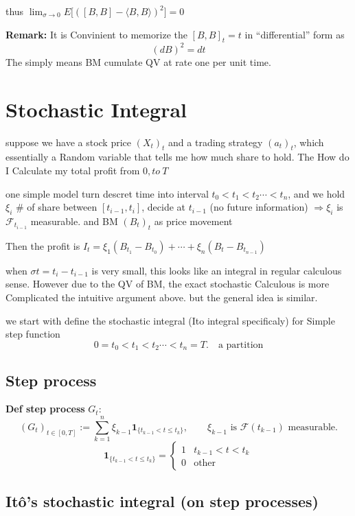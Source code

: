 \documentclass[
  letterpaper,
  DIV=11,
  numbers=noendperiod]{scrreprt}
\theoremstyle{definition}
\theoremstyle{plain}
\theoremstyle{plain}
\theoremstyle{definition}
\theoremstyle{plain}
\theoremstyle{plain}
\theoremstyle{remark}
\begin{document}
thus
\(\lim_{\sigma \to 0} E\big[([B, B] - \langle B, B\rangle)^2\big] = 0\)

\textbf{Remark:} It is Convinient to memorize the \([B, B]_t = t\) in
``differential'' form as \[
(dB)^2 = dt
\] The simply means BM cumulate QV at rate one per unit time.

\chapter{Stochastic Integral}\label{stochastic-integral}

suppose we have a stock price \((X_t)_t\) and a trading strategy
\((a_t)_t\), which essentially a Random variable that tells me how much
share to hold. The How do I Calculate my total profit from \(0, to\ T\)

one simple model turn descret time into interval
\(t_0 < t_1 < t_2 \cdots < t_n\), and we hold \(\xi_i\) \# of share
between \([t_{i-1}, t_i]\), decide at \(t_{i-1}\) (no future
information) \(\Rightarrow \xi_i\) is \(\mathcal{F}_{t_{i-1}}\)
measurable. and BM \((B_t)_t\) as price movement

Then the profit is
\(I_t = \xi_1(B_{t_1} - B_{t_0}) + \cdots + \xi_n(B_t - B_{t_{n-1}})\)

when \(\sigma t = t_i - t_{i-1}\) is very small, this looks like an
integral in regular calculous sense. However due to the QV of BM, the
exact stochastic Calculous is more Complicated the intuitive argument
above. but the general idea is similar.

we start with define the stochastic integral (Ito integral specificaly)
for Simple step function \[
0 = t_0 < t_1 < t_2 \cdots < t_n = T. \quad \text{a partition}
\]

\section{Step process}\label{step-process}

\textbf{Def step process} \(G_t\): \[
(G_t)_{t \in [0,T]} := \sum_{k=1}^{n} \xi_{k-1} \mathbf{1}_{\{t_{k-1} < t \leq t_k\}}, \qquad \xi_{k-1} \text{ is } \mathcal{F}(t_{k-1}) \text{ measurable.}
\] \[
\mathbf{1}_{\{t_{k-1} < t \leq t_k\}} = \begin{cases} 1 & t_{k-1} < t < t_k \\ 0 & \text{other} \end{cases}
\]

\section{Itô's stochastic integral (on step
processes)}\label{ituxf4s-stochastic-integral-on-step-processes}
\end{document}
